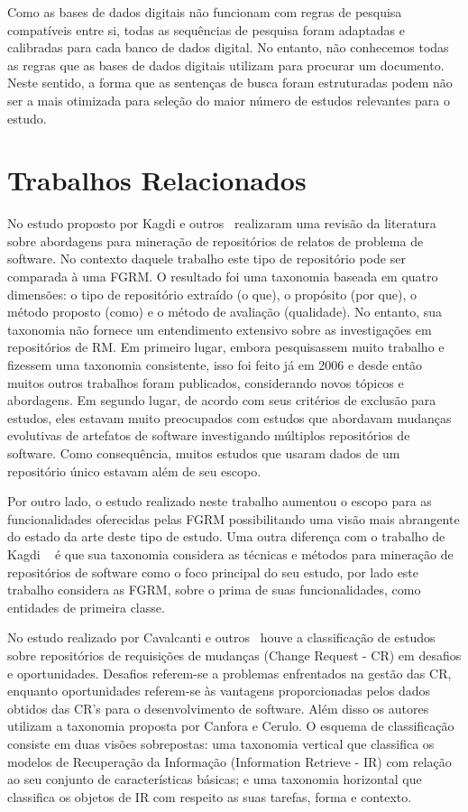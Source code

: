 Como as bases de dados digitais não funcionam com regras de pesquisa compatíveis
entre si, todas as sequências de pesquisa foram adaptadas e calibradas para cada
banco de dados digital. No entanto, não conhecemos todas as regras que as bases
de dados digitais utilizam para procurar um documento. Neste sentido, a forma
que as sentenças de busca foram estruturadas podem não ser a mais otimizada para
seleção do maior número de estudos relevantes para o estudo.

\section{Trabalhos Relacionados}
\label{sec:trabalhos_relacionados}

No estudo proposto por Kagdi e outros~\cite{kagdi2012assigning} realizaram uma
revisão da literatura sobre abordagens para mineração de repositórios de relatos
de problema de software. No contexto daquele trabalho este tipo de repositório
pode ser comparada à uma FGRM\@. O resultado foi uma taxonomia baseada em quatro
dimensões: o tipo de repositório extraído (o que), o propósito (por que), o
método proposto (como) e o método de avaliação (qualidade). No entanto, sua
taxonomia não fornece um entendimento extensivo sobre as investigações em
repositórios de RM. Em primeiro lugar, embora pesquisassem muito trabalho e
fizessem uma taxonomia consistente, isso foi feito já em 2006 e desde então
muitos outros trabalhos foram publicados, considerando novos tópicos e
abordagens. Em segundo lugar, de acordo com seus critérios de exclusão para
estudos, eles estavam muito preocupados com estudos que abordavam mudanças
evolutivas de artefatos de software investigando múltiplos repositórios de
software. Como consequência, muitos estudos que usaram dados de um repositório
único estavam além de seu escopo.

Por outro lado, o estudo realizado neste trabalho aumentou o escopo para as
funcionalidades oferecidas pelas FGRM possibilitando uma visão mais abrangente
do estado da arte deste tipo de estudo. Uma outra diferença com o trabalho de
Kagdi ~\cite{kagdi2012assigning} é que sua taxonomia considera as técnicas e
métodos para mineração de repositórios de software como o foco principal do seu
estudo, por lado este trabalho considera as FGRM, sobre o prima de suas
funcionalidades, como entidades de primeira classe.

No estudo realizado por Cavalcanti e outros~\cite{cavalcanti2014challenges}
houve a classificação de estudos sobre repositórios de requisições de mudanças
(Change Request - CR) em desafios e oportunidades.  Desafios referem-se a
problemas enfrentados na gestão das CR, enquanto oportunidades referem-se às
vantagens proporcionadas pelos dados obtidos das  CR's para o desenvolvimento de
software. Além disso os autores utilizam a taxonomia proposta por Canfora e
Cerulo\cite{cerulo2004taxonomy}. O esquema de classificação consiste em duas
visões sobrepostas: uma taxonomia vertical que classifica os modelos de
Recuperação da Informação (Information Retrieve - IR) com relação ao seu
conjunto de características básicas; e uma taxonomia horizontal que classifica
os objetos de IR com respeito as suas tarefas, forma e contexto.

